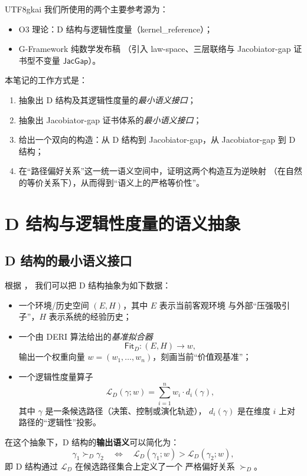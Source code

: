 \documentclass[12pt]{article}
\newcommand{\JacGap}{\mathsf{JacGap}}
\begin{document}
\begin{CJK*}{UTF8}{gkai}
我们所使用的两个主要参考源为：
\begin{itemize}
  \item O3 理论：D 结构与逻辑性度量（kernel\_reference）\cite{O3DStructureLogicalMetric}；
  \item G-Framework 纯数学发布稿 \cite{GaoZheng2025GFramework}（引入 law-space、三层联络与 Jacobiator-gap 证书型不变量 $\JacGap$）。
\end{itemize}

本笔记的工作方式是：
\begin{enumerate}
  \item 抽象出 D 结构及其逻辑性度量的\emph{最小语义接口}；
  \item 抽象出 Jacobiator-gap 证书体系的\emph{最小语义接口}；
  \item 给出一个双向的构造：从 D 结构到 Jacobiator-gap，从 Jacobiator-gap
        到 D 结构；
  \item 在“路径偏好关系”这一统一语义空间中，证明这两个构造互为逆映射
        （在自然的等价关系下），从而得到“语义上的严格等价性”。
\end{enumerate}

\section{D 结构与逻辑性度量的语义抽象}

\subsection{D 结构的最小语义接口}

根据 \cite{O3DStructureLogicalMetric}，
我们可以把 D 结构抽象为如下数据：
\begin{itemize}
  \item 一个环境/历史空间 $(E,H)$，其中 $E$ 表示当前客观环境
        与外部“压强吸引子”，$H$ 表示系统的经验历史；
  \item 一个由 DERI 算法给出的\emph{基准拟合器}
        \[
          \mathsf{Fit}_D : (E,H)\longrightarrow w,
        \]
        输出一个权重向量 $w=(w_1,\dots,w_n)$，刻画当前“价值观基准”；
  \item 一个逻辑性度量算子
        \[
          \mathcal{L}_D(\gamma;w)
          =
          \sum_{i=1}^n w_i\cdot d_i(\gamma),
        \]
        其中 $\gamma$ 是一条候选路径（决策、控制或演化轨迹），
        $d_i(\gamma)$ 是在维度 $i$ 上对路径的“逻辑性”投影。
\end{itemize}
在这个抽象下，D 结构的\textbf{输出语义}可以简化为：
\begin{equation}
  \gamma_1
  \succ_D
  \gamma_2
  \quad\Longleftrightarrow\quad
  \mathcal{L}_D(\gamma_1;w)
  >
  \mathcal{L}_D(\gamma_2;w),
  \label{eq:D-order}
\end{equation}
即 D 结构通过 $\mathcal{L}_D$ 在候选路径集合上定义了一个
严格偏好关系 $\succ_D$。


\end{CJK*}
\end{document}

